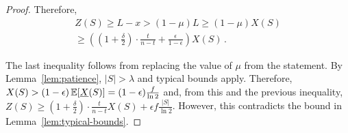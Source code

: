 \begin{proof}
  Therefore,
  \begin{align*}
    Z(S) \geq L - x > (1 - \mu)L \geq (1 - \mu)X(S)\\
    \geq ((1 + \frac{\delta}{2})\cdot\frac{t}{n - t} + \frac{\epsilon}{1 - \epsilon})X(S)\,.
  \end{align*}

  The last inequality follows from replacing the value of $\mu$ from the statement.
  By Lemma~\ref{lem:patience}, $|S| > \lambda$ and typical bounds apply. Therefore,
  $X(S) > (1 - \epsilon)\mathop{{}\mathbb{E}}[\underline{X}(S)] = (1 - \epsilon)\frac{f}{\ln2}$ and,
  from this and the previous inequality,
  $Z(S) \geq (1 + \frac{\delta}{2})\cdot\frac{t}{n - t}X(S) + \epsilon f \frac{|S|}{\ln2}$.
  However, this contradicts the bound in Lemma~\ref{lem:typical-bounds}.
  \Qed
\end{proof}

